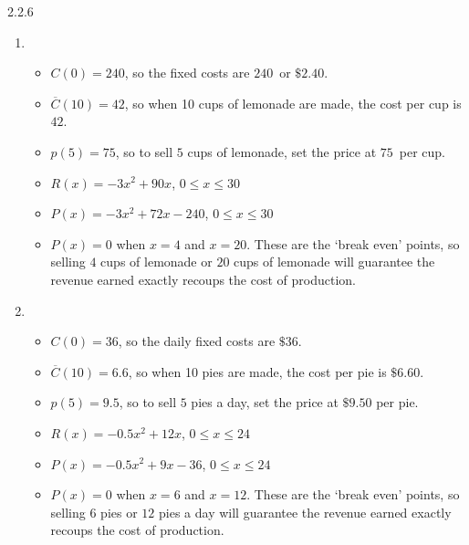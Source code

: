 \begin{Answer}{2.2.6}
\begin{enumerate}
\begin{itemize}
		\end{itemize}


		\item \begin{itemize}

			\item  $C(0) = 240$, so the fixed costs are $240$\textcent \,  or $\$2.40$.

			\item  $\overline{C}(10) = 42$, so when 10 cups of lemonade are made, the cost per cup is $42$\textcent.

			\item  $p(5) = 75$, so to sell $5$ cups of lemonade, set the price at $75$\textcent \,  per cup.

			\item $R(x) = -3x^2+90x$, $0 \leq x \leq 30$

			\item  $P(x) = -3x^2+72x-240$, $0 \leq x \leq 30$

			\item  $P(x) = 0$ when $x = 4$ and $x=20$.  These are the `break even' points, so selling $4$ cups of lemonade or $20$ cups of lemonade will guarantee the revenue earned exactly recoups the cost of production.

		\end{itemize}


		\item  \begin{itemize}

			\item  $C(0) = 36$, so the daily fixed costs are $\$36$.

			\item  $\overline{C}(10) = 6.6$, so when 10 pies are made, the cost per pie is $\$6.60$.

			\item  $p(5) = 9.5$, so to sell $5$ pies a day, set the price at $\$9.50$  per pie.

			\item $R(x) = -0.5 x^2 + 12x$, $0 \leq x \leq 24$

			\item  $P(x) = -0.5 x^2+9x-36$, $0 \leq x \leq 24$

			\item  $P(x) = 0$ when $x = 6$ and $x=12$.  These are the `break even' points, so selling $6$ pies or $12$ pies a day will guarantee the revenue earned exactly recoups the cost of production.


\end{itemize}
\end{enumerate}
\end{Answer}
